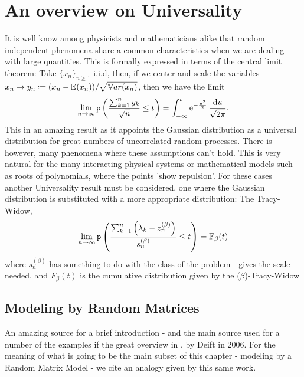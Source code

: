 \section{An overview on Universality}

It is well know among physicists and mathematicians alike that random independent phenomena share a common characteristics when we are dealing with large quantities. This is formally expressed in terms of the central limit theorem: Take $\{x_n\}_{n\geq1}$ i.i.d, then, if we center and scale the variables $x_n \rightarrow y_n \deff (x_n - \E(x_n)) / \sqrt{\Var(x_n)}$, then we have the limit
\begin{equation}
	\lim_{n\rightarrow \infty} \mathtt{p}\left( \frac{\sum_{k=1}^{n} y_k}{\sqrt{n}} \leq t \right) = \int_{-\infty}^t \operatorname{e}^{-\frac{u^2}{2}} \frac{\mathrm{d} u}{\sqrt{2\pi}}.
\end{equation} 
This in an amazing result as it appoints the Gaussian distribution as a universal distribution for great numbers of uncorrelated random processes.  There is however, many phenomena where these assumptions can't hold. This is very natural for the many interacting physical systems or mathematical models such as roots of polynomials, where the points 'show repulsion'. For these cases another Universality result must be considered, one where the Gaussian distribution is substituted with a more appropriate distribution: The Tracy-Widow,
\begin{equation}
	\lim_{n\rightarrow \infty} \mathtt{p}\left( \frac{\sum_{k=1}^{n} \left( \lambda_k - z_n^{(\beta)}\right)}{s^{(\beta)}_n} \leq t \right) = \mathbb{F}_{\beta}(t)
\end{equation}
where $s_n^{(\beta)}$ has something to do with the class of the problem - gives the scale needed, and $F_\beta(t)$ is the cumulative distribution given by the ($\beta$)-Tracy-Widow

\subsection{Modeling by Random Matrices}

An amazing source for a brief introduction - and the main source used for a number of the examples if the great overview in \cite{deift2006universalitymathematicalphysicalsystems}, by Deift in $2006$. For the meaning of what is going to be the main subset of this chapter - modeling by a Random Matrix Model - we cite an analogy given by this same work.
\\

